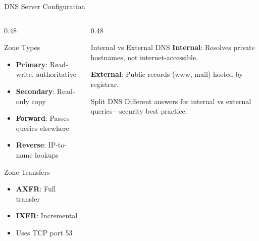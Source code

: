 \documentclass[aspectratio=169, 11pt]{beamer}
\begin{document}
\begin{frame}{DNS Server Configuration}
    \begin{columns}[T]
        \begin{column}{0.48\textwidth}
            \begin{block}{Zone Types}
                \small
                \begin{itemize}\setlength{\itemsep}{1pt}
                    \item \textbf{Primary}: Read-write, authoritative
                    \item \textbf{Secondary}: Read-only copy
                    \item \textbf{Forward}: Passes queries elsewhere
                    \item \textbf{Reverse}: IP-to-name lookups
                \end{itemize}
            \end{block}
            
            \vspace{0.2em}
            \begin{block}{Zone Transfers}
                \small
                \begin{itemize}\setlength{\itemsep}{1pt}
                    \item \textbf{AXFR}: Full transfer
                    \item \textbf{IXFR}: Incremental
                    \item Uses TCP port 53
                \end{itemize}
            \end{block}
        \end{column}
        \begin{column}{0.48\textwidth}
            \begin{block}{Internal vs External DNS}
                \small
                \textbf{Internal}: Resolves private hostnames, not internet-accessible.
                
                \vspace{0.2em}
                \textbf{External}: Public records (www, mail) hosted by registrar.
            \end{block}
            
            \vspace{0.2em}
            \begin{alertblock}{Split DNS}
                \small
                Different answers for internal vs external queries---security best practice.
            \end{alertblock}
            

\end{column}
\end{columns}
\end{frame}
\end{document}
